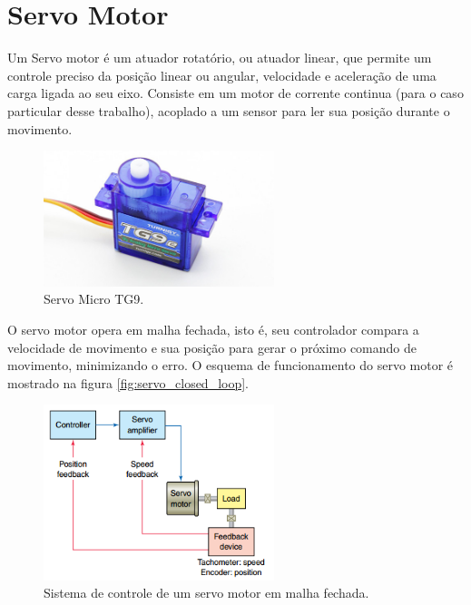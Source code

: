 \section{Servo Motor}
\label{sec:servomotor}

Um Servo motor é um atuador rotatório, ou atuador linear, que permite um controle preciso da posição linear ou angular, velocidade e aceleração de uma carga ligada ao seu eixo. Consiste em um motor de corrente continua (para o caso particular desse trabalho), acoplado a um sensor para ler sua posição durante o movimento.  \par

\begin{figure}[h]
	\centering
	\includegraphics[width=0.6\textwidth]{figuras/servo_g9.jpg}
	\caption{Servo Micro TG9.}
	\label{fig:servo_g9}
\end{figure}

O servo motor opera em malha fechada, isto é, seu controlador compara a velocidade de movimento e sua posição para gerar o próximo comando de movimento, minimizando o erro.  O esquema de funcionamento do servo motor é mostrado na figura \autoref{fig:servo_closed_loop}. 

\begin{figure}[h]
	\centering
	\includegraphics[width=0.6\textwidth]{figuras/servo_closed_loop.png}
	\caption{Sistema de controle de um servo motor em malha fechada.}
	\label{fig:servo_closed_loop}
\end{figure}




